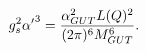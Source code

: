 \begin{equation}\label{secondone}
g_s^2{\alpha'}^3={\alpha_{GUT}^2L(Q)^2\over (2\pi)^6M_{GUT}^6}.
\end{equation}

